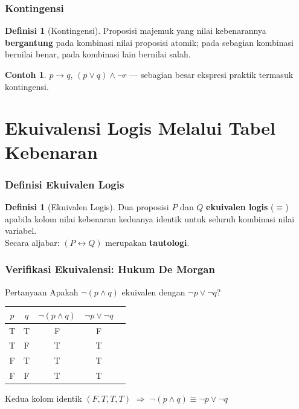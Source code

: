 \documentclass[handout]{beamer}
\theoremstyle{definition}
\newtheorem{definisi}[theorem]{Definisi}
\theoremstyle{example}
\newtheorem{contoh}[theorem]{Contoh}
\begin{document}
\begin{frame}
\frametitle{Kontingensi}
\begin{definisi}[Kontingensi]
Proposisi majemuk yang nilai kebenarannya \textbf{bergantung} pada kombinasi nilai proposisi atomik; pada sebagian kombinasi bernilai benar, pada kombinasi lain bernilai salah.
\end{definisi}
\begin{contoh}
$p \rightarrow q$, $(p \vee q) \wedge \neg r$ --- sebagian besar ekspresi praktik termasuk kontingensi.
\end{contoh}
\end{frame}

\section{Ekuivalensi Logis Melalui Tabel Kebenaran}

\begin{frame}
\frametitle{Definisi Ekuivalen Logis}
\begin{definisi}[Ekuivalen Logis]
Dua proposisi $P$ dan $Q$ \textbf{ekuivalen logis} ($\equiv$) apabila kolom nilai kebenaran keduanya identik untuk seluruh kombinasi nilai variabel.\\
Secara aljabar: $(P \leftrightarrow Q)$ merupakan \textbf{tautologi}.
\end{definisi}
\end{frame}

\begin{frame}
\frametitle{Verifikasi Ekuivalensi: Hukum De Morgan}
\begin{block}{Pertanyaan}
Apakah $\neg(p \wedge q)$ ekuivalen dengan $\neg p \vee \neg q$?
\end{block}
\begin{center}
\small
\begin{tabular}{|c|c||c|c||c|}
\hline
$p$ & $q$ & $\neg(p \wedge q)$ & $\neg p \vee \neg q$ & \\ \hline
T & T & F & F & \\ \hline
T & F & T & T & \\ \hline
F & T & T & T & \\ \hline
F & F & T & T & \\ \hline
\end{tabular}
\end{center}
Kedua kolom identik $(F,T,T,T)$ $\Rightarrow$ $\neg(p \wedge q) \equiv \neg p \vee \neg q$
\end{frame}
\end{document}
